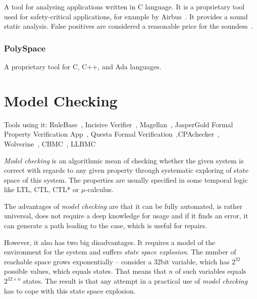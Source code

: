 A tool for analysing applications written in C language. It is a proprietary tool used for safety-critical applications, for example by Airbus~\cite{KrenaVojnarOverview}. It provides a sound static analysis. False positives are considered a reasonable price for the soundess~\cite{Astree1}.

\subsubsection{PolySpace}

A proprietary tool for C, C++, and Ada languages.

\section{Model Checking}\label{chap:fav:modelChecking}
Tools using it: RuleBase~\cite{KrenaVojnarOverview}, Incisive Verifier~\cite{KrenaVojnarOverview}, Magellan~\cite{KrenaVojnarOverview}, JasperGold Formal Property Verification App~\cite{KrenaVojnarOverview}, Questa Formal Verification~\cite{KrenaVojnarOverview},CPAchecker~\cite{KrenaVojnarOverview}, Wolverine~\cite{KrenaVojnarOverview}, CBMC~\cite{KrenaVojnarOverview}, LLBMC~\cite{KrenaVojnarOverview}

{\em Model checking} is an algorithmic mean of checking whether the given system is correct with regards to any given property through systematic exploring of state space of this system. The properties are usually specified in some temporal logic like LTL, CTL, CTL* or $\mu$-calculus.

The advantages of {\em model checking} are that it can be fully automated, is rather universal, does not require a deep knowledge for usage and if it finds an error, it can generate a path leading to the case, which is useful for repairs.

However, it also has two big disadvantages. It requires a model of the environment for the system and suffers {\em state space explosion}. The number of reachable space grows exponentially -- consider a 32bit variable, which has $2^{32}$ possible values, which equals states. That means that $n$ of such variables equals $2^{32\times n}$ states. The result is that any attempt in a practical use of {\em model checking} has to cope with this state space explosion.

